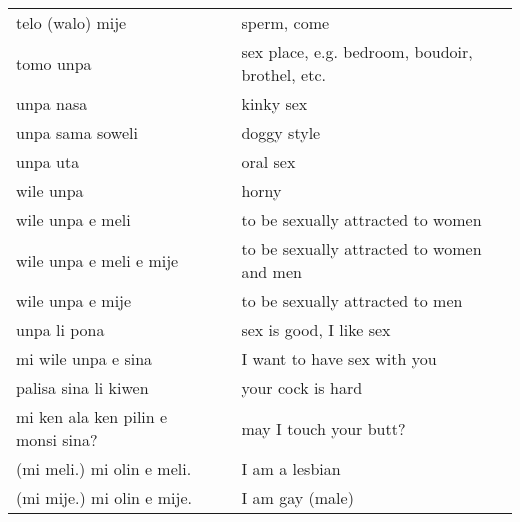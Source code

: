 \begin{supertabular}{p{4,5cm}|ll}
    telo (walo) mije                   &  & sperm, come                                                                       \\
    tomo unpa                          &  & sex place, e.g. bedroom, boudoir, brothel, etc.                                   \\
    unpa nasa                          &  & kinky sex                                                                         \\
    unpa sama soweli                   &  & doggy style                                                                       \\
    unpa uta                           &  & oral sex                                                                          \\
    wile unpa                          &  & horny                                                                             \\
    wile unpa e meli                   &  & to be sexually attracted to women                                                 \\
    wile unpa e meli e mije            &  & to be sexually attracted to women and men                                         \\
    wile unpa e mije                   &  & to be sexually attracted to men                                                   \\
    unpa li pona                       &  & sex is good, I like sex                                                           \\
    mi wile unpa e sina                &  & I want to have sex with you                                                       \\
    palisa sina li kiwen               &  & your cock is hard                                                                 \\
    mi ken ala ken pilin e monsi sina? &  & may I touch your butt?                                                            \\
    (mi meli.) mi olin e meli.         &  & I am a lesbian                                                                    \\
    (mi mije.) mi olin e mije.         &  & I am gay (male)                                                                   \\
\end{supertabular} \\
%
%

